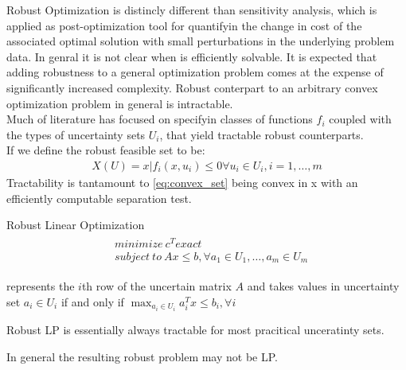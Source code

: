 \documentclass{beamer}
\begin{document}
\begin{frame}{}
Robust Optimization is distincly different than sensitivity analysis, which is applied as post-optimization tool for quantifyin the change in cost of the associated optimal solution with small perturbations in the underlying problem data.
In genral it is not clear when \label{eq:robust_optimization} is efficiently solvable. It is expected that adding robustness to a general optimization problem comes at the expense of significantly increased complexity. Robust conterpart to an arbitrary convex optimization problem in general is intractable. \\
Much of literature has focused on specifyin classes of functions $f_{i}$ coupled with the types of uncertainty sets $U_i$, that yield tractable robust counterparts.\\
If we define the robust feasible set to be:
\begin{align}
\label{eq:convex_set}
X(U) = {x | f_i(x, u_i) \leq 0 \forall u_i \in U_i, i = 1,\dots,m}
\end{align}
Tractability is tantamount to \ref{eq:convex_set} being convex in x with an efficiently computable separation test.
\end{frame}

\begin{frame}{Robust Linear Optimization}
\begin{align}
\begin{split}
\label{eq:robust_liear_programming}
& minimize~c^{T}exact \\
& subject~to~Ax \leq b, \forall a_1 \in U_1,\dots, a_m \in U_m
\end{split}
\end{align}
\begin{description}
\item [$a_i$] represents the $i$th row of the uncertain matrix $A$ and takes values in uncertainty set $a_i \in U_i$ if and only if $\max_{a_i \in U_i}a_i^Tx \leq b_i, \forall i$
\item Robust LP is essentially always tractable for most pracitical unceratinty sets.
\item In general the resulting robust problem may not be LP.
\end{description}
\end{frame}
\end{document}
